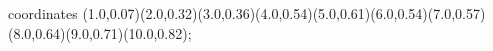 					coordinates { (1.0,0.07)(2.0,0.32)(3.0,0.36)(4.0,0.54)(5.0,0.61)(6.0,0.54)(7.0,0.57)(8.0,0.64)(9.0,0.71)(10.0,0.82)};